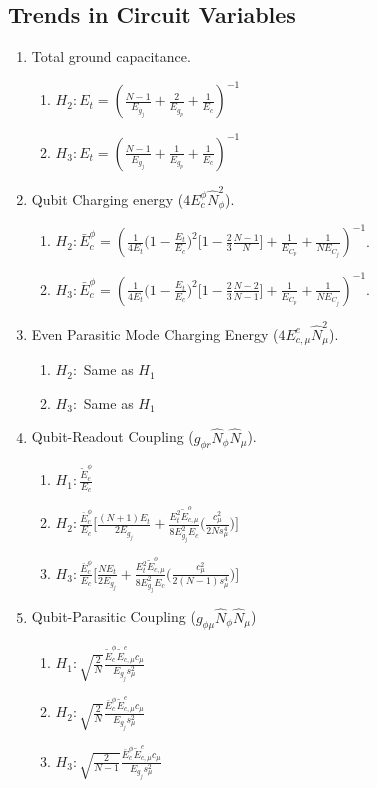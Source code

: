 \documentclass[prx,showpacs,notitlepage,twocolumn,superscriptaddress,nofootinbib,preprintnumbers,floatfix]{revtex4-2}
\begin{document}
\subsection{Trends in Circuit Variables}
\begin{enumerate}
    \item Total ground capacitance.
    \begin{enumerate}
        \item $H_2: E_t=(\frac{N-1}{E_{g_j}}+\frac{2}{E_{g_p}}+\frac{1}{E_c})^{-1}$
    \item $H_3: E_t=(\frac{N-1}{E_{g_j}}+\frac{1}{E_{g_p}}+\frac{1}{E_c})^{-1}$
    \end{enumerate}
\item Qubit Charging energy ($4E_c^\phi \hat N_{\phi}^2$). 
    \begin{enumerate}
    \item $H_2: \bar{E}_c^\phi=(\frac{1}{4E_t}\Big(1-\frac{E_t}{E_c}\Big)^2\Big[1-\frac{2}{3}\frac{N-1}{N}\Big]+\frac{1}{E_{C_p}}+\frac{1}{NE_{C_j}})^{-1}$. 
    \item  $H_3: \bar{E}_c^\phi=(\frac{1}{4E_t}\Big(1-\frac{E_t}{E_c}\Big)^2\Big[1-\frac{2}{3}\frac{N-2}{N-1}\Big]+\frac{1}{E_{C_p}}+\frac{1}{NE_{C_j}})^{-1}$.
    \end{enumerate}
    
\item Even Parasitic Mode Charging Energy  ($4E_{c,\mu}^e \hat N_{\mu}^2$). 
    \begin{enumerate}
    \item $H_2:$ Same as $H_1$
    \item $H_3:$ Same as $H_1$
\end{enumerate}
     \item Qubit-Readout Coupling ($g_{\phi r}\hat N_\phi \hat N_\mu$).
    \begin{enumerate}
        \item $H_1: \frac{\tilde{E}_c^\phi}{E_c}$
        \item $H_2:\frac{\bar{E}_c^\phi}{E_c} \Big[\frac{(N+1)E_t}{2E_{g_j}}+\frac{E_t^2\tilde{E}_{c,\mu}^o}{8E_{g_j}^2E_c} \Big(\frac{c_\mu^2}{2Ns_\mu^4}\Big)\Big]$
        \item $H_3:\frac{\bar{E}_c^\phi}{E_c} \Big[\frac{NE_t}{2E_{g_j}}+\frac{E_t^2\tilde{E}_{c,\mu}^o}{8E_{g_j}^2E_c} \Big(\frac{c_\mu^2}{2(N-1)s_\mu^4}\Big)\Big]$
    \end{enumerate}
\item Qubit-Parasitic Coupling ($g_{\phi\mu}\hat N_\phi \hat N_\mu$)    
    \begin{enumerate}
        \item $H_1: \sqrt{\frac{2}{N}} \frac{\tilde{E}^\phi_c\tilde{E}^e_{c,\mu}c_\mu}{E_{g_j}s_\mu^2}$
        \item $H_2:\sqrt{\frac{2}{N}} \frac{\bar{E}^\phi_c\tilde{E}^{e}_{c,\mu}c_\mu}{E_{g_j}s_\mu^2}$
        \item $H_3:\sqrt{\frac{2}{N-1}} \frac{\bar{E}^\phi_c\tilde{E}^{e}_{c,\mu}c_\mu}{E_{g_j}s_\mu^2}$
    \end{enumerate}


\end{enumerate}
\end{document}
